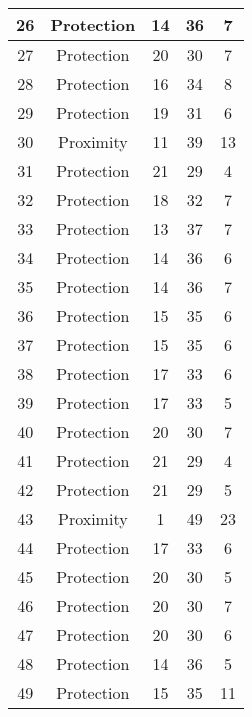 \documentclass[results.tex]{subfiles}
\begin{document}
\begin{center}
\begin{tabular}{| c || c | c | c | c |}
    \hline
    26 & Protection & 14 & 36 & 7 \\ 
    \hline
    27 & Protection & 20 & 30 & 7 \\ 
    \hline
    28 & Protection & 16 & 34 & 8 \\ 
    \hline
    29 & Protection & 19 & 31 & 6 \\ 
    \hline
    30 & Proximity & 11 & 39 & 13 \\ 
    \hline
    31 & Protection & 21 & 29 & 4 \\ 
    \hline
    32 & Protection & 18 & 32 & 7 \\ 
    \hline
    33 & Protection & 13 & 37 & 7 \\ 
    \hline
    34 & Protection & 14 & 36 & 6 \\ 
    \hline
    35 & Protection & 14 & 36 & 7 \\ 
    \hline
    36 & Protection & 15 & 35 & 6 \\ 
    \hline
    37 & Protection & 15 & 35 & 6 \\ 
    \hline
    38 & Protection & 17 & 33 & 6 \\ 
    \hline
    39 & Protection & 17 & 33 & 5 \\ 
    \hline
    40 & Protection & 20 & 30 & 7 \\ 
    \hline
    41 & Protection & 21 & 29 & 4 \\ 
    \hline
    42 & Protection & 21 & 29 & 5 \\ 
    \hline
    43 & Proximity & 1 & 49 & 23 \\ 
    \hline
    44 & Protection & 17 & 33 & 6 \\ 
    \hline
    45 & Protection & 20 & 30 & 5 \\ 
    \hline
    46 & Protection & 20 & 30 & 7 \\ 
    \hline
    47 & Protection & 20 & 30 & 6 \\ 
    \hline
    48 & Protection & 14 & 36 & 5 \\ 
    \hline
    49 & Protection & 15 & 35 & 11 \\ 
    \hline   \end{tabular}
\end{center}
\end{document}
